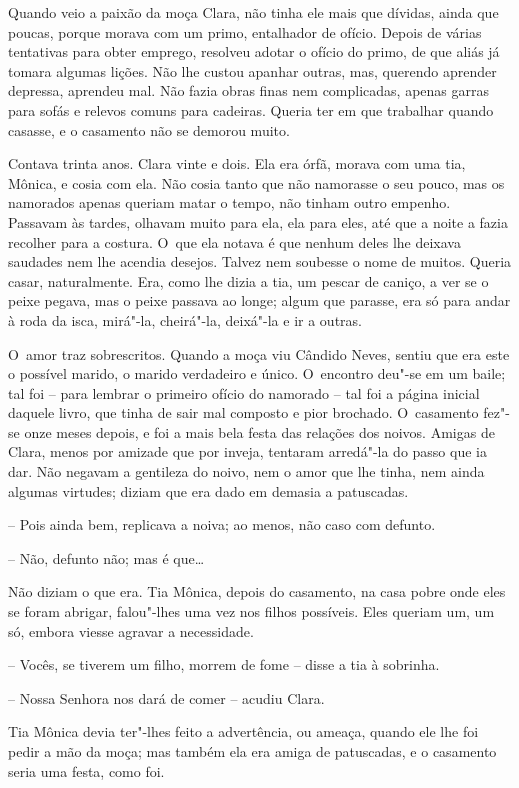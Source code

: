 Quando veio a paixão da moça Clara, não tinha ele mais que dívidas,
ainda que poucas, porque morava com um primo, entalhador de ofício.
Depois de várias tentativas para obter emprego, resolveu adotar o ofício
do primo, de que aliás já tomara algumas lições. Não lhe custou apanhar
outras, mas, querendo aprender depressa, aprendeu mal. Não fazia obras
finas nem complicadas, apenas garras para sofás e relevos comuns para
cadeiras. Queria ter em que trabalhar quando casasse, e o casamento não
se demorou muito.

Contava trinta anos. Clara vinte e dois. Ela era órfã, morava com uma
tia, Mônica, e cosia com ela. Não cosia tanto que não namorasse o seu
pouco, mas os namorados apenas queriam matar o tempo, não tinham outro
empenho. Passavam às tardes, olhavam muito para ela, ela para eles, até
que a noite a fazia recolher para a costura. O~que ela notava é que
nenhum deles lhe deixava saudades nem lhe acendia desejos. Talvez nem
soubesse o nome de muitos. Queria casar, naturalmente. Era, como lhe
dizia a tia, um pescar de caniço, a ver se o peixe pegava, mas o peixe
passava ao longe; algum que parasse, era só para andar à roda da isca,
mirá"-la, cheirá"-la, deixá"-la e ir a outras.

O~amor traz sobrescritos. Quando a moça viu Cândido Neves, sentiu que
era este o possível marido, o marido verdadeiro e único. O~encontro
deu"-se em um baile; tal foi -- para lembrar o primeiro ofício do
namorado -- tal foi a página inicial daquele livro, que tinha de sair
mal composto e pior brochado. O~casamento fez"-se onze meses depois, e
foi a mais bela festa das relações dos noivos. Amigas de Clara, menos
por amizade que por inveja, tentaram arredá"-la do passo que ia dar. Não
negavam a gentileza do noivo, nem o amor que lhe tinha, nem ainda
algumas virtudes; diziam que era dado em demasia a patuscadas.

-- Pois ainda bem, replicava a noiva; ao menos, não caso com defunto.

-- Não, defunto não; mas é que\ldots{}

Não diziam o que era. Tia Mônica, depois do casamento, na casa pobre
onde eles se foram abrigar, falou"-lhes uma vez nos filhos possíveis.
Eles queriam um, um só, embora viesse agravar a necessidade.

-- Vocês, se tiverem um filho, morrem de fome -- disse a tia à sobrinha.

-- Nossa Senhora nos dará de comer -- acudiu Clara.

Tia Mônica devia ter"-lhes feito a advertência, ou ameaça, quando ele lhe
foi pedir a mão da moça; mas também ela era amiga de patuscadas, e o
casamento seria uma festa, como foi.

